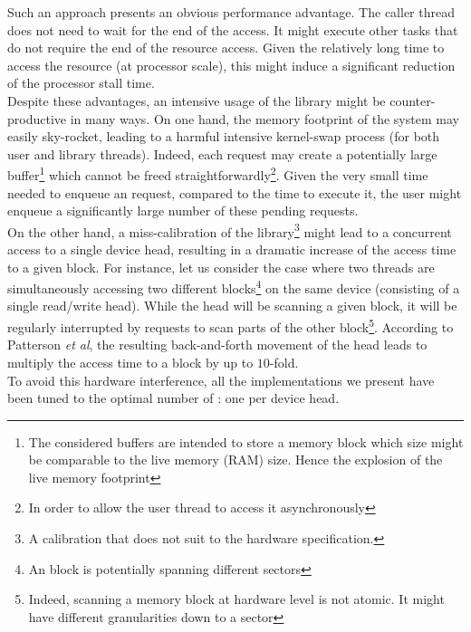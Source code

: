		Such an approach presents an obvious performance advantage.   The caller thread does not need to wait for the end of the \notationaio\space access.  It might execute other tasks that do not require the end of the resource access.   Given the relatively long time to access the \notationIO\space resource (at processor scale), this might induce a significant reduction of the processor stall time.\\

		Despite these advantages, an intensive usage of the \notationaioShort\space library might be counter-productive in many ways.
		On one hand, the memory footprint of the system may easily sky-rocket, leading to a harmful intensive kernel-swap process (for both user and \notationaioShort\space library threads).   Indeed, each \notationIO\space request may create a potentially large buffer\footnote{The considered buffers are intended to store a memory block which size might be comparable to the live memory (RAM) size.   Hence the explosion of the live memory footprint} which cannot be freed straightforwardly\footnote{In order to allow the user thread to access it asynchronously}.   Given the very small time needed to enqueue an \notationIO\space request, compared to the time to execute it, the user might enqueue a significantly large number of these pending requests.\\

		On the other hand, a miss-calibration of the \notationaioShort\space library\footnote{A calibration that does not suit to the hardware specification.} might lead to a concurrent access to a single \notationIO\space device head, resulting in a dramatic increase of the access time to a given \notationIO\space block.   For instance, let us consider the case where two threads are simultaneously accessing two different blocks\footnote{An \notationIO block is potentially spanning different \notationIO\space sectors} on the same \notationIO\space device (consisting of a single read/write head).   While the head will be scanning a given block, it will be regularly interrupted by requests to scan parts of the other block\footnote{Indeed, scanning a memory block at hardware level is not atomic.   It might have different granularities down to a sector}.   According to Patterson \textit{et al}\cite{patterson1994exposing}, the resulting back-and-forth movement of the \notationIO\space head leads to multiply the access time to a block by up to $10$-fold.\\
		To avoid this hardware interference, all the implementations we present have been tuned to the optimal number of \notationaioWriteThreads: one \notationaioWriteThread\space per \notationIO\space device head.\\

